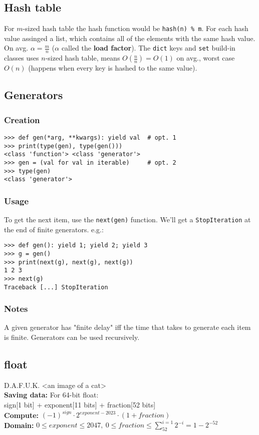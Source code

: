\documentclass[]{article}
\begin{document}
\begin{multicols}{2}
		\subsection{Hash table}
		For $ m $-sized hash table the hash function would be \texttt{hash(n) \% m}. For each hash value assinged a list, which contains all of the elements with the same hash value. On avg. $ \alpha = \tfrac{m}{n} $ ($ \alpha $ called the \textbf{load factor}). The \texttt{dict} keys and \texttt{set} build-in classes uses $ n $-sized hash table, means $ O(\tfrac{n}{n}) = O(1) $ on avg., worst case $ O(n) $ (happens when every key is hashed to the same value).
		
		\subsection{Generators}
		\subsubsection{Creation}
		\begin{lstlisting}
>>> def gen(*arg, **kwargs): yield val  # opt. 1
>>> print(type(gen), type(gen()))
<class 'function'> <class 'generator'>
>>> gen = (val for val in iterable)     # opt. 2
>>> type(gen)
<class 'generator'>\end{lstlisting}
		\subsubsection{Usage}
		To get the next item, use the \texttt{next(gen)} function. We'll get a \texttt{StopIteration} at the end of finite generators. e.g.:
		\begin{lstlisting}[emph={StopIteration,Traceback}]
>>> def gen(): yield 1; yield 2; yield 3
>>> g = gen()
>>> print(next(g), next(g), next(g))
1 2 3
>>> next(g)
Traceback [...] StopIteration\end{lstlisting}
		\subsubsection{Notes}
		A given generator has "finite delay" iff the time that takes to generate each item is finite.
		Generators can be used recursively. 
		
		\subsection{float}
		D.A.F.U.K. <an image of a cat> \\
		\textbf{Saving data: }
		For 64-bit float: \\
		sign[1 bit] + exponent[11 bits] + fraction[52 bits] \\
		\textbf{Compute: } $ (-1)^{sign} \cdot 2^{exponent - 2023} \cdot (1 + fraction) $ \\
		\textbf{Domain: }$ 0 \le exponent \le 2047, \ 0 \le fraction \le \sum_{52}^{i = 1} 2^{-i} = 1 - 2^{-52} $
		

\end{multicols}
\end{document}
